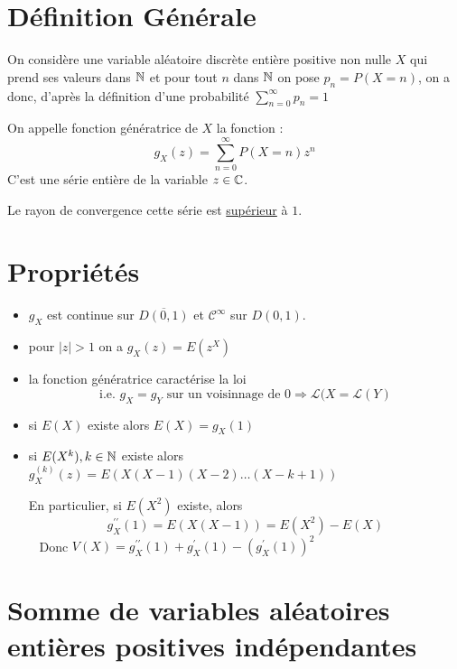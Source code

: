 
\section*{Définition Générale}

On considère une variable aléatoire discrète entière positive non nulle $X$ qui prend ses valeurs dans $\mathbb{N}$ et pour tout $n$ dans $\mathbb{N}$ on pose 
$p_n = P(X = n)$, on a donc, d'après la définition d'une probabilité $ \sum_{n=0}^{\infty} p_n = 1 $

\begin{definition}
    On appelle fonction génératrice de $X$ la fonction :
        \[ \boxed{ g_X(z) = \sum_{n=0}^{\infty} P(X = n) z^n} \] 
    C'est une série entière de la variable $z \in \mathbb{C}$.    
\end{definition}

\begin{remark}
    Le rayon de convergence cette série est \underline{supérieur} à $1$.
\end{remark}

\section*{Propriétés}

\begin{itemize}
    \item $g_X$ est continue sur $ \overline{D(0, 1)}$ et $\mathcal{C}^\infty$ sur $D(0, 1)$.
    \item pour $|z| > 1$ on a $g_X(z) = E(z^X)$
    \item la fonction génératrice caractérise la loi 
        \[ \text{i.e. } g_X = g_Y \text{ sur un voisinnage de 0} \Longrightarrow \mathcal{L}(X = \mathcal{L}(Y) \] 
    \item si $E(X)$ existe alors $E(X) = g_X(1)$ 
    \item si $E(X^k), k \in \mathbb{N}$ existe alors $g_X^{(k)}(z) = E(X(X-1)(X-2) \dots (X - k + 1))$ 
        
        En particulier, si $E(X^2)$ existe, alors 
            \[ g_X^{\prime \prime}(1) = E(X(X-1)) = E(X^2) - E(X) \] 
        Donc $ V(X) = g_X^{\prime \prime}(1) + g_X^{\prime}(1) - (g_X^{\prime}(1))^2 $
\end{itemize}


\section*{Somme de variables aléatoires entières positives indépendantes}

